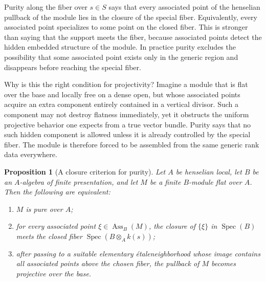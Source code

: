 \documentclass[11pt,oneside]{article}
\newtheorem{proposition}[theorem]{Proposition}
\newcommand{\Spec}{\operatorname{Spec}}
\newcommand{\Ass}{\operatorname{Ass}}
\newcommand{\etale}{\'etale}
\begin{document}
Purity along the fiber over $s\in S$ says that every associated point of the henselian pullback of the module lies in the closure of the special fiber.  Equivalently, every associated point specializes to some point on the closed fiber.  This is stronger than saying that the support meets the fiber, because associated points detect the hidden embedded structure of the module.  In practice purity excludes the possibility that some associated point exists only in the generic region and disappears before reaching the special fiber.

Why is this the right condition for projectivity?  Imagine a module that is flat over the base and locally free on a dense open, but whose associated points acquire an extra component entirely contained in a vertical divisor.  Such a component may not destroy flatness immediately, yet it obstructs the uniform projective behavior one expects from a true vector bundle.  Purity says that no such hidden component is allowed unless it is already controlled by the special fiber.  The module is therefore forced to be assembled from the same generic rank data everywhere.

\begin{proposition}[A closure criterion for purity]\label{prop:closure-purity-long}
Let $A$ be henselian local, let $B$ be an $A$-algebra of finite presentation, and let $M$ be a finite $B$-module flat over $A$.  Then the following are equivalent:
\begin{enumerate}[label=\textup{(\roman*)}]
\item $M$ is pure over $A$;
\item for every associated point $\xi\in\Ass_B(M)$, the closure of $\{\xi\}$ in $\Spec(B)$ meets the closed fiber $\Spec(B\otimes_A k(s))$;
\item after passing to a suitable elementary \etale neighborhood whose image contains all associated points above the chosen fiber, the pullback of $M$ becomes projective over the base.
\end{enumerate}
\end{proposition}
\end{document}
